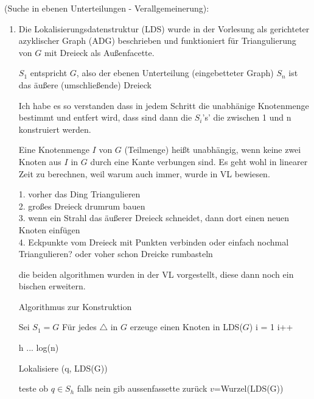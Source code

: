 \documentclass[a4paper, titlepage=false, parskip=full-, 10pt]{scrartcl}
\newcounter{tasknbr}
\newenvironment{task}[1]{{\bf Aufgabe \arabic {tasknbr}\stepcounter{tasknbr}} (#1):\begin{enumerate}}{\end{enumerate}}
\begin{document}
\newpage
\begin{task}{Suche in ebenen Unterteilungen - Verallgemeinerung}
\item[]

Die Lokalisierungsdatenstruktur (LDS) wurde in der Vorlesung als gerichteter azyklischer Graph (ADG) beschrieben und funktioniert für Triangulierung von $G$ mit Dreieck als Außenfacette.

$S_1$ entspricht $G$, also der ebenen Unterteilung  (eingebetteter Graph)
$S_n$ ist das äußere (umschließende) Dreieck

Ich habe es so verstanden dass in jedem Schritt die unabhänige Knotenmenge bestimmt und entfert wird, dass sind dann die $S_i$'s' die zwischen 1 und n konstruiert werden.

Eine Knotenmenge $I$ von $G$ (Teilmenge) heißt unabhängig, wenn keine zwei Knoten aus $I$ in $G$ durch eine Kante verbungen sind. Es geht wohl in linearer Zeit zu berechnen, weil warum auch immer, wurde in VL bewiesen.




1. vorher das Ding Triangulieren\\
2. großes Dreieck drumrum bauen\\
3. wenn ein Strahl das äußerer Dreieck schneidet, dann dort einen neuen Knoten einfügen\\
4. Eckpunkte vom Dreieck mit Punkten verbinden oder einfach nochmal Triangulieren? oder voher schon Dreicke rumbasteln

die beiden algorithmen wurden in der VL vorgestellt, diese dann noch ein bischen erweitern.

\begin{algorithm}
\caption{Algorithmus zur Konstruktion}
\begin{algorithmic}[1]
\STATE Sei $S_1=G$
\STATE Für jedes $\triangle$ in $G$ erzeuge einen Knoten in LDS($G$)
\STATE i = 1
    \STATE i++
\ENDWHILE
\end{algorithmic}
\end{algorithm}


h ... log(n)

\begin{algorithm}
\caption{Lokalisiere (q, LDS(G))}
\begin{algorithmic}[1]
\STATE teste ob $q \in S_h$ falls nein gib aussenfassette zurück
\STATE $v$=Wurzel(LDS(G))
\ENDWHILE
\end{algorithmic}
\end{algorithm}


\end{task}
\end{document}
